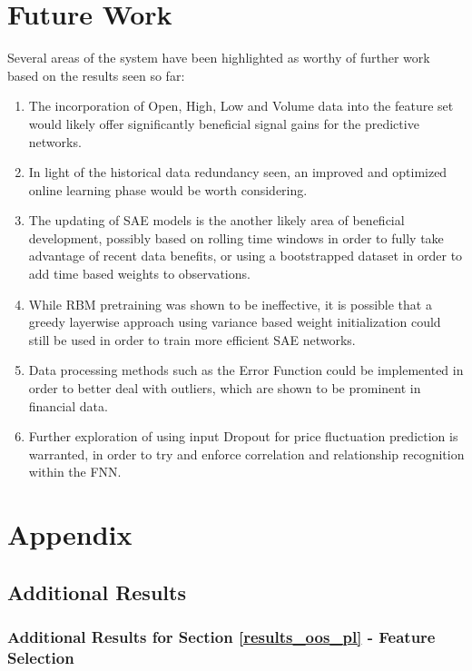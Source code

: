 \documentclass[a4paper,11pt,oneside]{article}
\theoremstyle{plain}
\theoremstyle{definition}
\begin{document}
	\newpage
	\section{Future Work}
	
	Several areas of the system have been highlighted as worthy of further work based on the results seen so far: 
	\begin{enumerate}
		\item The incorporation of Open, High, Low and Volume data into the feature set would likely offer significantly beneficial signal gains for the predictive networks.
		\item In light of the historical data redundancy seen, an improved and optimized online learning phase would be worth considering.
		\item The updating of SAE models is the another likely area of beneficial development, possibly based on rolling time windows in order to fully take advantage of recent data benefits, or using a bootstrapped dataset in order to add time based weights to observations.
		\item While RBM pretraining was shown to be ineffective, it is possible that a greedy layerwise approach using variance based weight initialization could still be used in order to train more efficient SAE networks.
		\item Data processing methods such as the Error Function could be implemented in order to better deal with outliers, which are shown to be prominent in financial data.
		\item Further exploration of using input Dropout for price fluctuation prediction is warranted, in order to try and enforce correlation and relationship recognition within the FNN.
	\end{enumerate}
	
	\newpage
	\section{Appendix}\label{Appendix}
	
	\subsection{Additional Results}
	
	\subsubsection{Additional Results for Section \ref{results_oos_pl} - Feature Selection }\label{results_features_appendix}
	
\end{document}
